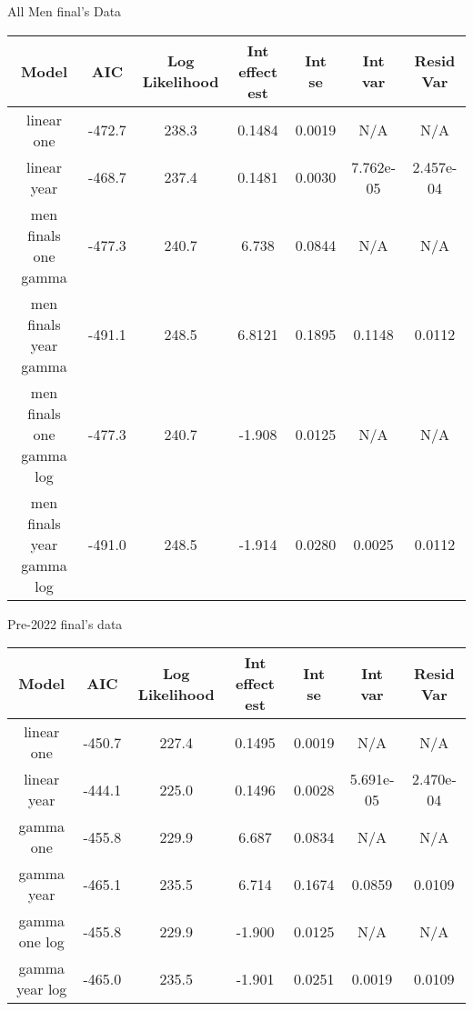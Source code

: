 \documentclass[12pt, letterpaper, titlepage]{article}
\begin{document}
All Men final's Data
\begin{center}
  \begin{tabular}{|c | c | c | c | c | c | c |} 
   \hline\hline
   Model & AIC & Log Likelihood & Int effect est & Int se & Int var & Resid Var \\ [0.5ex] 
   \hline
   linear one & -472.7 & 238.3 & 0.1484 & 0.0019 & N/A & N/A \\ 
   \hline
   linear year & -468.7 & 237.4 & 0.1481 & 0.0030 & 7.762e-05 & 2.457e-04 \\
   \hline
   men finals one gamma & -477.3 & 240.7 & 6.738 & 0.0844 & N/A & N/A \\
   \hline
   men finals year gamma & -491.1 & 248.5 & 6.8121 & 0.1895 & 0.1148 & 0.0112 \\
   \hline
   men finals one gamma log & -477.3 & 240.7 & -1.908 & 0.0125 & N/A & N/A \\
   \hline
   men finals year gamma log & -491.0 & 248.5 & -1.914 & 0.0280 & 0.0025 & 0.0112 \\ [0.5ex]
   \hline
  \end{tabular}
\end{center}

Pre-2022 final's data
\begin{center}
  \begin{tabular}{|c | c | c | c | c | c | c |} 
   \hline\hline
   Model & AIC & Log Likelihood & Int effect est & Int se & Int var & Resid Var \\ [0.5ex] 
   \hline
   linear one & -450.7 & 227.4 & 0.1495 & 0.0019 & N/A & N/A \\
   \hline
   linear year & -444.1 & 225.0 & 0.1496 & 0.0028 & 5.691e-05 & 2.470e-04 \\ 
   \hline
   gamma one & -455.8 & 229.9 & 6.687 & 0.0834 & N/A & N/A \\
   \hline
   gamma year & -465.1 & 235.5 & 6.714 & 0.1674 & 0.0859 & 0.0109 \\
   \hline
   gamma one log & -455.8 & 229.9 & -1.900 & 0.0125 & N/A & N/A \\
   \hline
   gamma year log & -465.0 & 235.5 & -1.901 & 0.0251 & 0.0019 & 0.0109 \\ [0.5ex]
   \hline
  \end{tabular}
  \end{center}
\end{document}
